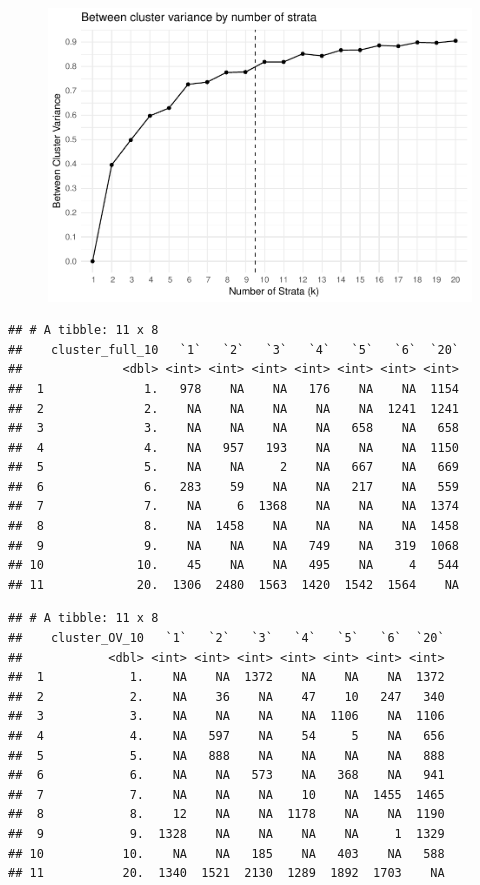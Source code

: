 \documentclass[floatsintext,man]{apa6}
\theoremstyle{definition}
\theoremstyle{definition}
\theoremstyle{definition}
\theoremstyle{remark}
\begin{document}
\begin{figure}
\centering
\includegraphics{Method_files/figure-latex/SUBS_OV_SSB/SST-1.pdf}
\caption{}
\end{figure}

\begin{verbatim}
## # A tibble: 11 x 8
##    cluster_full_10   `1`   `2`   `3`   `4`   `5`   `6`  `20`
##              <dbl> <int> <int> <int> <int> <int> <int> <int>
##  1              1.   978    NA    NA   176    NA    NA  1154
##  2              2.    NA    NA    NA    NA    NA  1241  1241
##  3              3.    NA    NA    NA    NA   658    NA   658
##  4              4.    NA   957   193    NA    NA    NA  1150
##  5              5.    NA    NA     2    NA   667    NA   669
##  6              6.   283    59    NA    NA   217    NA   559
##  7              7.    NA     6  1368    NA    NA    NA  1374
##  8              8.    NA  1458    NA    NA    NA    NA  1458
##  9              9.    NA    NA    NA   749    NA   319  1068
## 10             10.    45    NA    NA   495    NA     4   544
## 11             20.  1306  2480  1563  1420  1542  1564    NA
\end{verbatim}

\begin{verbatim}
## # A tibble: 11 x 8
##    cluster_OV_10   `1`   `2`   `3`   `4`   `5`   `6`  `20`
##            <dbl> <int> <int> <int> <int> <int> <int> <int>
##  1            1.    NA    NA  1372    NA    NA    NA  1372
##  2            2.    NA    36    NA    47    10   247   340
##  3            3.    NA    NA    NA    NA  1106    NA  1106
##  4            4.    NA   597    NA    54     5    NA   656
##  5            5.    NA   888    NA    NA    NA    NA   888
##  6            6.    NA    NA   573    NA   368    NA   941
##  7            7.    NA    NA    NA    10    NA  1455  1465
##  8            8.    12    NA    NA  1178    NA    NA  1190
##  9            9.  1328    NA    NA    NA    NA     1  1329
## 10           10.    NA    NA   185    NA   403    NA   588
## 11           20.  1340  1521  2130  1289  1892  1703    NA
\end{verbatim}
\end{document}

